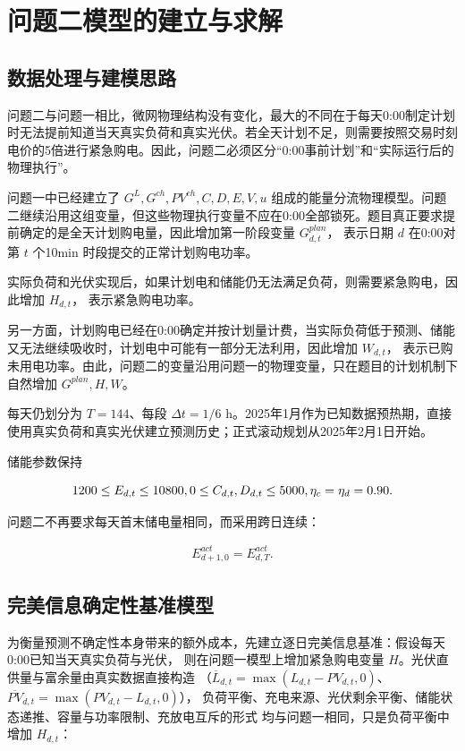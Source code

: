 \section{问题二模型的建立与求解}

\subsection{数据处理与建模思路}

问题二与问题一相比，微网物理结构没有变化，最大的不同在于每天0:00制定计划时无法提前知道当天真实负荷和真实光伏。若全天计划不足，则需要按照交易时刻电价的5倍进行紧急购电。因此，问题二必须区分“0:00事前计划”和“实际运行后的物理执行”。

问题一中已经建立了 \(G^L,G^{ch},PV^{ch},C,D,E,V,u\) 组成的能量分流物理模型。问题二继续沿用这组变量，但这些物理执行变量不应在0:00全部锁死。题目真正要求提前确定的是全天计划购电量，因此增加第一阶段变量 \(G^{plan}_{d,t}\)， 表示日期 \(d\) 在0:00对第 \(t\) 个10min 时段提交的正常计划购电功率。

实际负荷和光伏实现后，如果计划电和储能仍无法满足负荷，则需要紧急购电，因此增加 \(H_{d,t}\)， 表示紧急购电功率。

另一方面，计划购电已经在0:00确定并按计划量计费，当实际负荷低于预测、储能又无法继续吸收时，计划电中可能有一部分无法利用，因此增加 \(W_{d,t}\)， 表示已购未用电功率。由此，问题二的变量沿用问题一的物理变量，只在题目的计划机制下自然增加 \(G^{plan},H,W\)。

每天仍划分为 \(T=144\)、每段 \(\Delta t=1/6\) h。2025年1月作为已知数据预热期，直接使用真实负荷和真实光伏建立预测历史；正式滚动规划从2025年2月1日开始。

储能参数保持

\[
1200\le E_{d,t}\le10800,\\
0\le C_{d,t},D_{d,t}\le5000,\\
\eta_c=\eta_d=0.90.
\]

问题二不再要求每天首末储电量相同，而采用跨日连续：

\begin{equation}
\begin{gathered}
E^{act}_{d+1,0}=E^{act}_{d,T}.
\end{gathered}
\end{equation}

\subsection{完美信息确定性基准模型}

为衡量预测不确定性本身带来的额外成本，先建立逐日完美信息基准：假设每天0:00已知当天真实负荷与光伏，
则在问题一模型上增加紧急购电变量 \(H\)。光伏直供量与富余量由真实数据直接构造
（\(\overline L_{d,t}=\max(L_{d,t}-PV_{d,t},0)\)、\(\overline{PV}_{d,t}=\max(PV_{d,t}-L_{d,t},0)\)），
负荷平衡、充电来源、光伏剩余平衡、储能状态递推、容量与功率限制、充放电互斥的形式
均与问题一相同，只是负荷平衡中增加 \(H_{d,t}\)：

